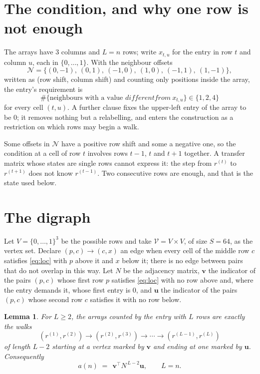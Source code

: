 \documentclass[11pt,a4paper]{article}
\theoremstyle{plain}
\newtheorem{lemma}[theorem]{Lemma}
\theoremstyle{definition}
\begin{document}
\section{The condition, and why one row is not enough}

The arrays have $3$ columns and $L=n$ rows; write $x_{t,u}$ for the entry in
row $t$ and column $u$, each in $\{0,\dots,1\}$. With the neighbour offsets
\[
\mathcal N=\{(0,-1),\ (0,1),\ (-1,0),\ (1,0),\ (-1,1),\ (1,-1)\},
\]
written as (row shift, column shift) and counting only positions inside the array, the
entry's requirement is
\begin{equation}\label{eq:loc}
\#\{\text{neighbours with a value }different from\ x_{t,u}\}\in\{1,2,4\}
\end{equation}
for every cell $(t,u)$. A further clause fixes the upper-left entry of the array to be $0$; it removes nothing but a relabelling, and enters the construction as a restriction on which rows may begin a walk.

Some offsets in $\mathcal N$ have a positive row shift and some a negative one, so the
condition at a cell of row $t$ involves rows $t-1$, $t$ and $t+1$ together. A transfer
matrix whose states are single rows cannot express it: the step from $r^{(t)}$ to
$r^{(t+1)}$ does not know $r^{(t-1)}$. Two consecutive rows are enough, and that is
the state used below.

\section{The digraph}

Let $V=\{0,\dots,1\}^{3}$ be the possible rows and take
$\mathcal V=V\times V$, of size $S=64$, as the vertex set. Declare $(p,c)\to(c,x)$ an edge
when every cell of the middle row $c$ satisfies \eqref{eq:loc} with $p$ above it and $x$
below it; there is no edge between pairs that do not overlap in this way. Let $N$ be the
adjacency matrix, $\mathbf{v}$ the indicator of the pairs $(p,c)$ whose first row $p$
satisfies \eqref{eq:loc} with no row above and, where the entry demands it, whose first entry is $0$, and $\mathbf{u}$ the indicator of
the pairs $(p,c)$ whose second row $c$ satisfies it with no row below.

\begin{lemma}\label{lem:walk}
For $L\ge2$, the arrays counted by the entry with $L$ rows are exactly the walks
\[
(r^{(1)},r^{(2)})\to(r^{(2)},r^{(3)})\to\cdots\to(r^{(L-1)},r^{(L)})
\]
of length $L-2$ starting at a vertex marked by $\mathbf{v}$ and ending at one marked by
$\mathbf{u}$. Consequently
\[
a(n)\;=\;\,\mathbf{v}^{\!\top}N^{\,L-2}\mathbf{u},\qquad L=n .
\]
\end{lemma}
\end{document}
